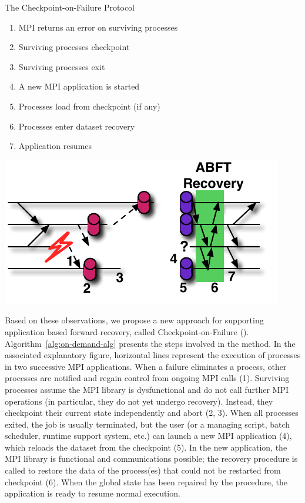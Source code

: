 \begin{algorithm}
\caption{The Checkpoint-on-Failure Protocol}
\label{alg:on-demand-alg}\label{fig:idea}
\centering
\begin{minipage}[b]{.55\linewidth}
	\begin{enumerate}\sffamily\small
		\item MPI returns an error on surviving processes 
		\item Surviving processes checkpoint
		\item Surviving processes exit
		\item A new MPI application is started
		\item Processes load from checkpoint (if any)
		\item Processes enter \abft dataset recovery
		\item Application resumes
	\end{enumerate}
\vfill
\end{minipage}
\hfill
\begin{minipage}[b]{.44\linewidth}
\includegraphics[width=\linewidth]{figures/idea.pdf}
\end{minipage}
\end{algorithm}

Based on these observations, we propose a new approach for supporting
application based forward recovery, called Checkpoint-on-Failure (\cof).
Algorithm~\ref{alg:on-demand-alg} presents the steps involved in the
\cof method. In the associated explanatory figure, horizontal lines
represent the execution of processes in two successive MPI applications.
When a failure eliminates a process, other processes are notified and
regain control from ongoing MPI calls (1). Surviving processes assume
the MPI library is dysfunctional and do not call further MPI operations
(in particular, they do not yet undergo \abft recovery). Instead, they
checkpoint their current state independently and abort (2, 3). When
all processes exited, the job is usually terminated, but the user (or a
managing script, batch scheduler, runtime support system, etc.) can
launch a new MPI application (4), which reloads the dataset from the 
checkpoint (5). In the new application, the MPI library is functional
and communications possible; the \abft recovery procedure is called to
restore the data of the process(es) that could not be restarted from
checkpoint (6). When the global state has been repaired by the \abft
procedure, the application is ready to resume normal execution.

